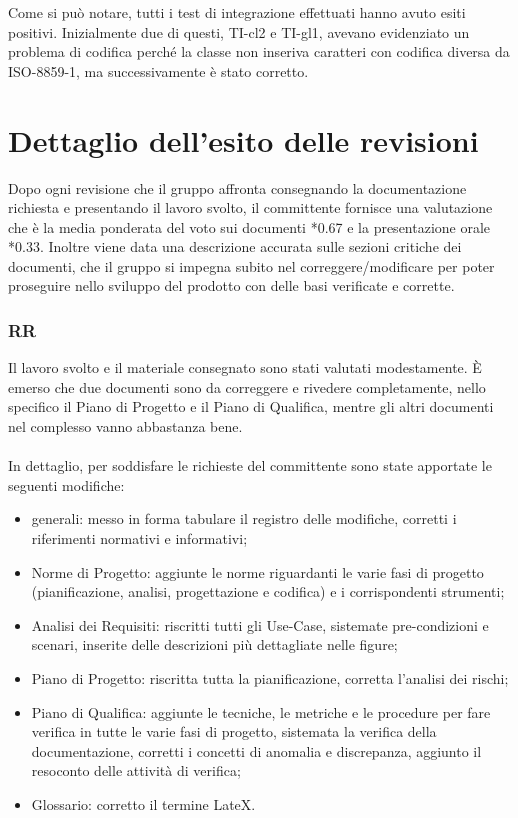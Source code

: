 Come si pu\`o notare, tutti i test di integrazione effettuati hanno avuto esiti
positivi. Inizialmente due di questi, TI-cl2 e TI-gl1, avevano evidenziato un
problema di codifica perch\'e la classe  non inseriva
caratteri con codifica diversa da ISO-8859-1, ma successivamente \`e stato
corretto.


\section{Dettaglio dell'esito delle revisioni}
Dopo ogni revisione che il gruppo affronta consegnando la documentazione
richiesta e presentando il lavoro svolto, il committente fornisce una
valutazione che \`e la media ponderata del voto sui documenti *0.67 e la
presentazione orale *0.33. Inoltre viene data una descrizione accurata
sulle sezioni critiche dei documenti, che il gruppo si impegna subito
nel correggere/modificare per poter proseguire nello sviluppo del prodotto con delle
basi verificate e corrette.

\subsubsection*{RR}
Il lavoro svolto e il materiale consegnato sono stati valutati modestamente. \`E
emerso che due documenti sono da correggere e rivedere completamente, nello
specifico il Piano di Progetto e il Piano di Qualifica, mentre gli altri documenti nel complesso
vanno abbastanza bene. \\ \\
In dettaglio, per soddisfare le richieste del committente sono state apportate
le seguenti modifiche:
\begin{itemize}
  \item generali: messo in forma tabulare il registro delle modifiche, corretti
  i riferimenti normativi e informativi;
  \item Norme di Progetto: aggiunte le norme riguardanti le varie fasi di
  progetto (pianificazione, analisi, progettazione e codifica) e i corrispondenti strumenti;
  \item Analisi dei Requisiti: riscritti tutti gli Use-Case, sistemate pre-condizioni e scenari,
  inserite delle descrizioni pi\`u dettagliate nelle figure;
  \item Piano di Progetto: riscritta tutta la pianificazione, corretta l'analisi
  dei rischi;
  \item Piano di Qualifica: aggiunte le tecniche, le metriche e le procedure per
  fare verifica in tutte le varie fasi di progetto, sistemata la verifica della
  documentazione, corretti i concetti di anomalia e discrepanza, aggiunto
  il resoconto delle attivit\`a di verifica;
  \item Glossario: corretto il termine LateX.
\end{itemize}


